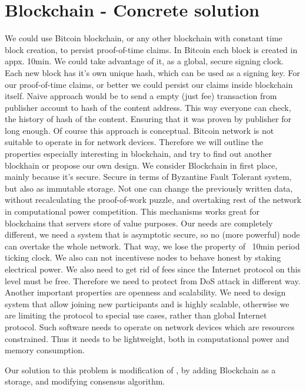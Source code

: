 \documentclass[nostrict]{szablonPG}
\begin{document}
\section{Blockchain - Concrete solution}
We could use Bitcoin blockchain, or any other blockchain with constant time block creation, to persist proof-of-time claims. In Bitcoin each block is created in appx. 10min. We could take advantage of it, as a global, secure signing clock. Each new block has it's own unique hash, which can be used as a signing key. For our proof-of-time claims, or better we could persist our claims inside blockchain itself. Naive approach would be to send a empty (just fee) transaction from publisher account to hash of the content address. This way everyone can check, the history of hash of the content. Ensuring that it was proven by publisher for long enough. Of course this approach is conceptual. Bitcoin network is not suitable to operate in for network devices. Therefore we will outline the properties especially interesting in blockchain, and try to find out another blockhain or propose our own design. We consider Blockchain in first place, mainly because it's secure. Secure in terms of Byzantine Fault Tolerant system, but also as immutable storage. Not one can change the previously written data, without recalculating the proof-of-work puzzle, and overtaking rest of the network in computational power competition. This mechanisms works great for blockchains that servers store of value purposes. Our needs are completely different, we need a system that is asymptotic secure, so no (more powerful) node can overtake the whole network. That way, we lose the property of ~10min period ticking clock. We also can not incentivese nodes to behave honest by staking electrical power. We also need to get rid of fees since the Internet protocol on this level must be free. Therefore we need to protect from DoS attack in different way. Another important properties are openness and scalability. We need to design system that allow joining new participants and is highly scalable, otherwise we are limiting the protocol to special use cases, rather than global Internet protocol. Such software needs to operate on network devices which are resources constrained. Thus it needs to be lightweight, both in computational power and memory consumption.

Our solution to this problem is modification of \cite{jekon2019content}, by adding Blockchain as a storage, and modifying consensus algorithm.
\end{document}
